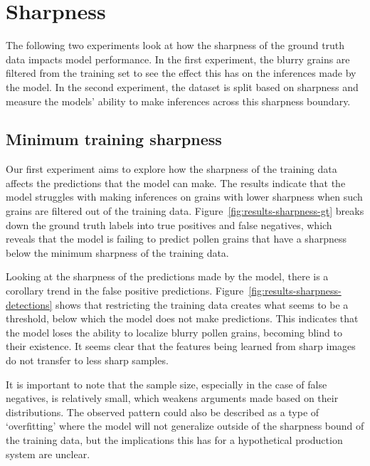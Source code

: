 \section{Sharpness}\label{sec:results-sharpness}
The following two experiments look at how the sharpness of the ground truth data impacts model performance.
In the first experiment, the blurry grains are filtered from the training set to see the effect this has on the inferences made by the model.
In the second experiment, the dataset is split based on sharpness and measure the models' ability to make inferences across this sharpness boundary.

\subsection{Minimum training sharpness}\label{sec:results-minimum}
Our first experiment aims to explore how the sharpness of the training data affects the predictions that the model can make.
The results indicate that the model struggles with making inferences on grains with lower sharpness when such grains are filtered out of the training data.
Figure~\ref{fig:results-sharpness-gt} breaks down the ground truth labels into true positives and false negatives, which reveals that the model is failing to predict pollen grains that have a sharpness below the minimum sharpness of the training data.

Looking at the sharpness of the predictions made by the model, there is a corollary trend in the false positive predictions.
Figure~\ref{fig:results-sharpness-detections} shows that restricting the training data creates what seems to be a threshold, below which the model does not make predictions.
This indicates that the model loses the ability to localize blurry pollen grains, becoming blind to their existence.
It seems clear that the features being learned from sharp images do not transfer to less sharp samples.

It is important to note that the sample size, especially in the case of false negatives, is relatively small, which weakens arguments made based on their distributions.
The observed pattern could also be described as a type of `overfitting' where the model will not generalize outside of the sharpness bound of the training data, but the implications this has for a hypothetical production system are unclear.

